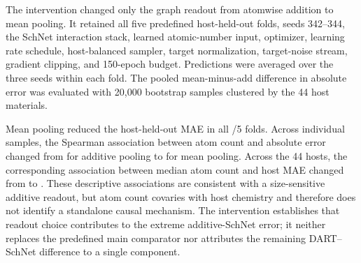 \documentclass[aps,prb,onecolumn,superscriptaddress,floatfix]{revtex4-2}
\begin{document}
The intervention changed only the graph readout from atomwise addition to mean
pooling.  It retained all five predefined host-held-out folds, seeds 342--344,
the SchNet interaction stack, learned atomic-number input, optimizer, learning
rate schedule, host-balanced sampler, target normalization, target-noise
stream, gradient clipping, and 150-epoch budget.  Predictions were averaged
over the three seeds within each fold.  The pooled mean-minus-add difference in
absolute error was evaluated with 20,000 bootstrap samples clustered by the 44
host materials.



Mean pooling reduced the host-held-out MAE in all
\PRMSchNetMeanBetterFolds{}/5 folds.  Across individual samples, the Spearman
association between atom count and absolute error changed from
\PRMSchNetAddSampleSizeErrorSpearman{} for additive pooling to
\PRMSchNetMeanSampleSizeErrorSpearman{} for mean pooling.  Across the 44 hosts,
the corresponding association between median atom count and host MAE changed
from \PRMSchNetAddHostSizeErrorSpearman{} to
\PRMSchNetMeanHostSizeErrorSpearman{}.  These descriptive associations are
consistent with a size-sensitive additive readout, but atom count covaries with
host chemistry and therefore does not identify a standalone causal mechanism.
The intervention establishes that readout choice contributes to the extreme
additive-SchNet error; it neither replaces the predefined main comparator nor
attributes the remaining DART--SchNet difference to a single component.


\end{document}
